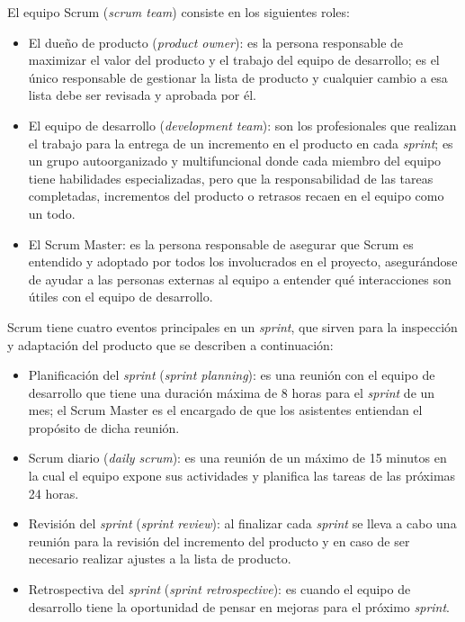 El equipo Scrum (\textit{scrum team}) consiste en los siguientes roles:
\begin{itemize}
	\item El dueño de producto (\textit{product owner}): es la persona responsable de maximizar el valor del producto y el trabajo del equipo de desarrollo; es el único responsable de gestionar la lista de producto y cualquier cambio a esa lista debe ser revisada y aprobada por él.
	\item El equipo de desarrollo (\textit{development team}): son los profesionales que realizan el trabajo para la entrega de un incremento en el producto en cada \textit{sprint}; es un grupo autoorganizado y multifuncional donde cada miembro del equipo tiene habilidades especializadas, pero que la responsabilidad de las tareas completadas, incrementos del producto o retrasos recaen en el equipo como un todo.
	\item  El Scrum Master: es la persona responsable de asegurar que Scrum es entendido y adoptado por todos los involucrados en el proyecto, asegurándose de ayudar a las personas externas al equipo a entender qué interacciones son útiles con el equipo de desarrollo.
\end{itemize}


Scrum tiene cuatro eventos principales en  un \textit{sprint}, que sirven para la inspección y adaptación del producto que se describen a continuación:
\begin{itemize}
	\item Planificación del \textit{sprint} (\textit{sprint planning}): es una reunión con el equipo de desarrollo que tiene una duración máxima de 8 horas para el \textit{sprint} de un mes; el Scrum Master es el encargado de que los asistentes entiendan el propósito de dicha reunión.
	\item Scrum diario (\textit{daily scrum}): es una reunión de un máximo de 15 minutos en la cual el equipo expone sus actividades y planifica las tareas de las próximas 24 horas.
	\item Revisión del \textit{sprint} (\textit{sprint review}): al finalizar cada \textit{sprint} se lleva a cabo una reunión para la revisión del incremento del producto y en caso de ser necesario realizar ajustes a la lista de producto.
	\item Retrospectiva del \textit{sprint} (\textit{sprint retrospective}): es cuando el equipo de desarrollo tiene la oportunidad de pensar en mejoras para el próximo \textit{sprint}.
\end{itemize}

